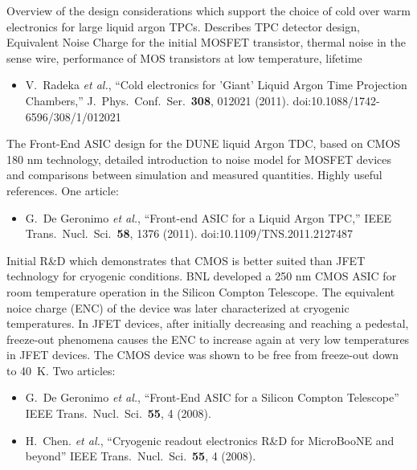 \documentclass[12pt]{article}
\begin{document}
\begin{thebibliography}{1}
Overview of the design considerations which support the choice of cold over warm electronics for large liquid argon TPCs.   Describes TPC detector design, Equivalent Noise Charge for the initial MOSFET transistor, thermal noise in the sense wire, performance of MOS transistors at low temperature, lifetime 
\begin{itemize}
\item V.~Radeka {\it et al.},
  ``Cold electronics for 'Giant' Liquid Argon Time Projection Chambers,''
  J.\ Phys.\ Conf.\ Ser.\  {\bf 308}, 012021 (2011).
  doi:10.1088/1742-6596/308/1/012021\\
\end{itemize}  

The Front-End ASIC design for the DUNE liquid Argon TDC, based on CMOS 180 nm technology, detailed introduction to noise model for MOSFET devices and comparisons between simulation and measured quantities.  Highly useful references.  One article:
\begin{itemize}
\item  G.~De Geronimo {\it et al.},
  ``Front-end ASIC for a Liquid Argon TPC,''
  IEEE Trans.\ Nucl.\ Sci.\  {\bf 58}, 1376 (2011).
    doi:10.1109/TNS.2011.2127487\\
\end{itemize}

Initial R\&D which demonstrates that CMOS is better suited than JFET technology for cryogenic conditions.
BNL developed a 250 nm CMOS ASIC for room temperature operation in the Silicon Compton Telescope.  The equivalent noice charge (ENC) of the  device was later characterized at cryogenic temperatures.
In JFET devices, after initially decreasing and reaching a pedestal, freeze-out phenomena causes the ENC to increase again at very low temperatures in JFET devices. The CMOS device was shown to be free from freeze-out down to 40~K.  Two articles:
\begin{itemize}
\item G.~De Geronimo {\it et al.},
  ``Front-End ASIC for a Silicon Compton Telescope''
  IEEE Trans.\ Nucl.\ Sci.\  {\bf 55}, 4 (2008).\\
\item  H.~Chen. {\it et al.},
  ``Cryogenic readout electronics R\&D for MicroBooNE and beyond''
  IEEE Trans.\ Nucl.\ Sci.\  {\bf 55}, 4 (2008).\\
\end{itemize}


\end{thebibliography}
\end{document}
